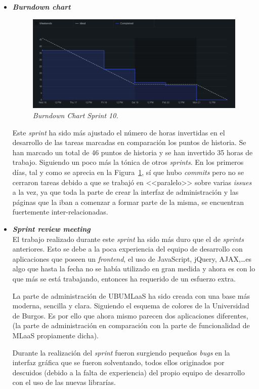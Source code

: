 \begin{itemize}
\item \textbf{\textit{Burndown chart}}\\
\begin{figure}
\begin{center}
\includegraphics[width=\textwidth]{../img/anexos/sprints/BD-Sprint10}
\caption{\textit{Burndown Chart Sprint 10.}}\label{fig:BD-Sprint10}
\end{center}
\end{figure}
Este \textit{sprint} ha sido más ajustado el número de horas invertidas en el desarrollo de las tareas marcadas en comparación los puntos de historia. Se han marcado un total de 46 puntos de historia y se han invertido 35 horas de trabajo. Siguiendo un poco más la tónica de otros \textit{sprints}. En los primeros días, tal y como se aprecia en la Figura~\ref{fig:BD-Sprint10}, sí que hubo \textit{commits} pero no se cerraron tareas debido a que se trabajó en <<paralelo>> sobre varias \textit{issues} a la vez, ya que toda la parte de crear la interfaz de administración y las páginas que la iban a comenzar a formar parte de la misma, se encuentran fuertemente inter-relacionadas.

\item \textbf{\textit{Sprint review meeting}}\\
El trabajo realizado durante este \textit{sprint} ha sido más duro que el de \textit{sprints} anteriores. Esto se debe a la poca experiencia del equipo de desarrollo con aplicaciones que poseen un \textit{frontend}, el uso de JavaScript, jQuery, AJAX,\dots es algo que hasta la fecha no se había utilizado en gran medida y ahora es con lo que más se está trabajando, entonces ha requerido de un esfuerzo extra.

La parte de administración de UBUMLaaS ha sido creada con una base más moderna, sencilla y clara. Siguiendo el esquema de colores de la Universidad de Burgos. Es por ello que ahora mismo parecen dos aplicaciones diferentes, (la parte de administración en comparación con la parte de funcionalidad de MLaaS propiamente dicha).

Durante la realización del \textit{sprint} fueron surgiendo pequeños \textit{bugs} en la interfaz gráfica que se fueron solventando, todos ellos originados por descuidos (debido a la falta de experiencia) del propio equipo de desarrollo con el uso de las nuevas librarías.
\end{itemize}

